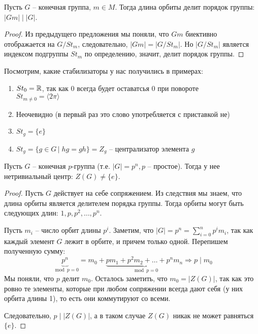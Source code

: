 \begin{follow}
    Пусть $G$ -- конечная группа, $m \in M$.
    Тогда длина орбиты делит порядок группы: $|Gm| \mid |G|$.
\end{follow}
\begin{proof}
    Из предыдущего предложения мы поняли, что $Gm$ биективно отображается на $G / St_m$, следовательно, $|Gm| = |G / St_m|$.
    Но $|G / St_m|$ является индексом подгруппы $St_m$ по определению, значит, делит порядок группы.
\end{proof}

Посмотрим, какие стабилизаторы у нас получились в примерах:
\begin{enumerate}
    \item $St_0 = \mathbb{R}$, так как 0 всегда будет оставатсья 0 при повороте \\ $St_{m \neq 0} = \langle 2\pi \rangle$
    \item Неочевидно (в первый раз это слово употребляется с приставкой не)
    \item $St_g = \{ e \}$
    \item $St_g = \{ g \in G \, | \; hg = gh \} = Z_g$ -- централизатор элемента $g$ 
\end{enumerate}

\begin{theorem}
    Пусть $G$ -- конечная $p$-группа (т.е. $|G| = p^n, p$ -- простое).
    Тогда у нее нетривиальный центр: $Z(G) \neq \{ e \}$.
\end{theorem}
\begin{proof}
    Пусть $G$ действует на себе сопряжением. 
    Из следствия мы знаем, что длина орбиты является делителем порядка группы. 
    Тогда орбиты могут быть следующих длин: $1, p, p^2, \dots, p^n$. 

    Пусть $m_i$ -- число орбит длины $p^i$. 
    Заметим, что $|G| = p^n = \sum\limits_{i = 0}^n p^im_i$, так как каждый элемент $G$ лежит в орбите, и причем только одной.
    Перепишем полученную сумму: \[ \underbrace{p^n}_{\mod p = 0} = m_0 + \underbrace{pm_1 + p^2m_2 + \dots + p^nm_n}_{\mod p = 0} \Rightarrow p \mid m_0 \]
    Мы поняли, что $p$ делит $m_0$. 
    Осталось заметить, что $m_0 = |Z(G)|$, так как это ровно те элементы, которые при любом сопряжении всегда дают себя (у них орбита длины 1), то есть они коммутируют со всеми.

    Следовательно, $p \mid |Z(G)|$, а в таком случае $Z(G)$ никак не может равняться $\{ e \}$.
\end{proof}


